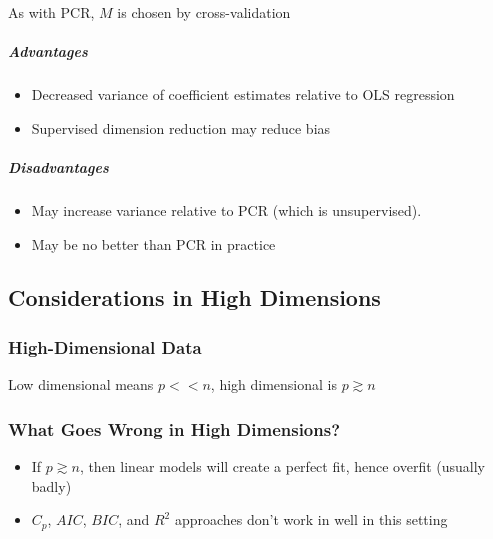 \documentclass[11pt]{article}
\providecommand{\tightlist}{%
      \setlength{\itemsep}{0pt}\setlength{\parskip}{0pt}}
\begin{document}
As with PCR, \(M\) is chosen by cross-validation

    \hypertarget{advantages}{%
\subparagraph{Advantages}\label{advantages}}

    \begin{itemize}
\tightlist
\item
  Decreased variance of coefficient estimates relative to OLS regression
\item
  Supervised dimension reduction may reduce bias
\end{itemize}

    \hypertarget{disadvantages}{%
\subparagraph{Disadvantages}\label{disadvantages}}

    \begin{itemize}
\tightlist
\item
  May increase variance relative to PCR (which is unsupervised).
\item
  May be no better than PCR in practice
\end{itemize}

    \hypertarget{considerations-in-high-dimensions}{%
\subsection{Considerations in High
Dimensions}\label{considerations-in-high-dimensions}}

    \hypertarget{high-dimensional-data}{%
\subsubsection{High-Dimensional Data}\label{high-dimensional-data}}

    Low dimensional means \(p << n\), high dimensional is \(p \gtrsim n\)

    \hypertarget{what-goes-wrong-in-high-dimensions}{%
\subsubsection{What Goes Wrong in High
Dimensions?}\label{what-goes-wrong-in-high-dimensions}}

    \begin{itemize}
\item
  If \(p \gtrsim n\), then linear models will create a perfect fit,
  hence overfit (usually badly)
\item
  \(C_p\), \(AIC\), \(BIC\), and \(R^2\) approaches don't work in well
  in this setting
\end{itemize}
\end{document}
